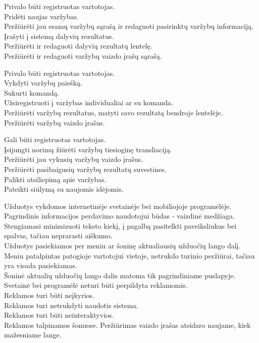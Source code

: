\documentclass{VUMIFPSkursinis}
\begin{document}
\begin{longtabu}
    {
      Privalo būti registruotas vartotojas. \\
      Pridėti naujas varžybas. \\
      Peržiūrėti jau esamų varžybų sąrašą ir redaguoti pasirinktų varžybų informaciją. \\
      Įrašyti į sistemą dalyvių rezultatus. \\
      Peržiūrėti ir redaguoti dalyvių rezultatų lentelę. \\
      Peržiūrėti ir redaguoti varžybų vaizdo įrašų sąrašą.
    }
        
    {
      Privalo būti registruotas vartotojas. \\
      Vykdyti varžybų paiešką. \\
      Sukurti komandą. \\
      Užsiregistruoti į varžybas individualiai ar su komanda. \\
      Peržiūrėti varžybų rezultatus, matyti savo rezultatą bendroje lentelėje. \\
      Peržiūrėti varžybų vaizdo įrašus.
    }

    {
      Gali būti registruotas vartotojas. \\
      Įsijungti norimų žiūrėti varžybų tiesioginę transliaciją. \\
      Peržiūrėti jau vykusių varžybų vaizdo įrašus. \\
      Peržiūrėti pasibaigusių varžybų rezultatų suvestines. \\
      Palikti atsiliepimą apie varžybas. \\
      Pateikti siūlymą su naujomis idėjomis.
    }
    
    {
      Užduotys vykdomos internetinėje svetainėje bei mobiliojoje programėlėje. \\
      Pagrindinis informacijos perdavimo naudotojui būdas - vaizdinė medžiaga. Stengiamasi minimizuoti teksto kiekį,
		į pagalbą pasitelkti paveiksliukus bei spalvas, tačiau neprarasti aiškumo. \\
      Užduotys pasiekiamos per meniu ar šoninę aktualiausių užduočių lango dalį. \\
      Meniu patalpintas patogioje vartotojui vietoje, netrukdo turinio peržiūrai, tačiau yra visada pasiekiamas. \\
      Šoninė aktualių užduočių lango dalis matoma tik pagrindiniame puslapyje.
    }
    {
      Svetainė bei programėlė neturi būti perpildyta reklamomis. \\
      Reklamos turi būti neįkyrios. \\
      Reklamos turi netrukdyti naudotis sistema. \\
      Reklamos turi būti neinteraktyvios. \\
      Reklamos talpinamos šonuose.
    }
    {
      Peržiūrimas vaizdo įrašas atsidaro naujame, kiek mažesniame lange.
    }
    

\end{longtabu}
\end{document}
